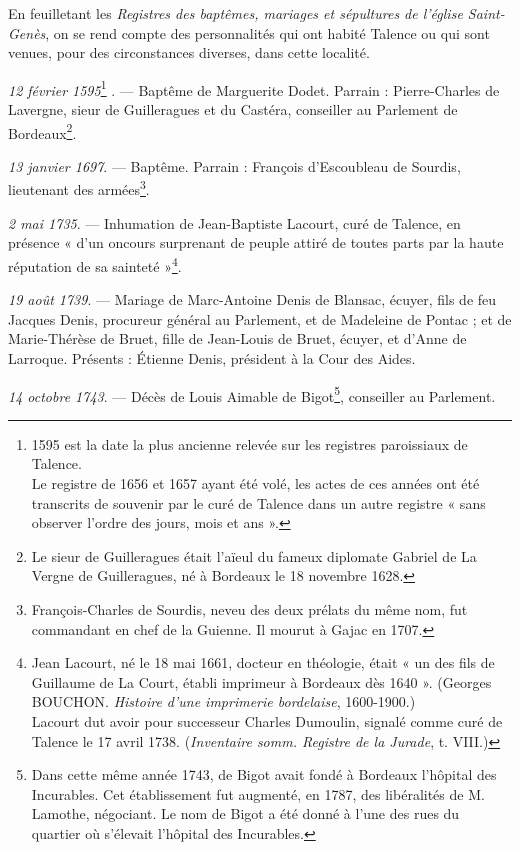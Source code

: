 \documentclass[a4paper,11pt]{book}
\begin{document}
En feuilletant les \textit{Registres des baptêmes, mariages et sépultures de l'église Saint-Genès}, on se rend compte des personnalités qui ont habité Talence ou qui sont venues, pour des circonstances diverses, dans cette localité.

\textit{12 février 1595}\footnote{1595 est la date la plus ancienne relevée sur les registres paroissiaux de Talence.\\Le registre de 1656 et 1657 ayant été volé, les actes de ces années
ont été transcrits de souvenir par le curé de Talence dans un autre
registre « sans observer l'ordre des jours, mois et ans ».
} . — Baptême de Marguerite Dodet. Parrain : Pierre-Charles de Lavergne, sieur de Guilleragues et du Castéra, conseiller au Parlement de Bordeaux\footnote{Le sieur de Guilleragues était l'aïeul du fameux diplomate Gabriel de La Vergne de Guilleragues, né à Bordeaux le 18 novembre 1628.}.

\textit{13 janvier 1697}. — Baptême. Parrain : François d'Escoubleau de Sourdis, lieutenant des armées\footnote{François-Charles de Sourdis, neveu des deux prélats du même nom, fut commandant en chef de la Guienne. Il mourut à Gajac en 1707.}.

\textit{2 mai 1735}. — Inhumation de Jean-Baptiste Lacourt, curé de Talence, en présence « d'un oncours surprenant de peuple attiré de toutes parts par la haute réputation de sa sainteté »\footnote{Jean Lacourt, né le 18 mai 1661, docteur en théologie, était « un des fils de Guillaume de La Court, établi imprimeur à Bordeaux dès 1640 ». (Georges BOUCHON. \textit{Histoire d'une imprimerie bordelaise}, 1600-1900.)\\Lacourt dut avoir pour successeur Charles Dumoulin, signalé comme curé de Talence le 17 avril 1738. (\textit{Inventaire somm. Registre de la Jurade}, t. VIII.)}.

\textit{19 août 1739}. — Mariage de Marc-Antoine Denis de Blansac, écuyer, fils de feu Jacques Denis, procureur général au Parlement, et de Madeleine de Pontac ; et de Marie-Thérèse de Bruet, fille de Jean-Louis de Bruet, écuyer, et d'Anne de Larroque. Présents : Étienne Denis, président à la Cour des Aides.

\textit{14 octobre 1743}. — Décès de Louis Aimable de Bigot\footnote{Dans cette même année 1743, de Bigot avait fondé à Bordeaux l'hôpital des Incurables. Cet établissement fut augmenté, en 1787, des libéralités de M. Lamothe, négociant. Le nom de Bigot a été donné à l'une des rues du quartier où s'élevait l'hôpital des Incurables.}, conseiller au Parlement.
\end{document}
